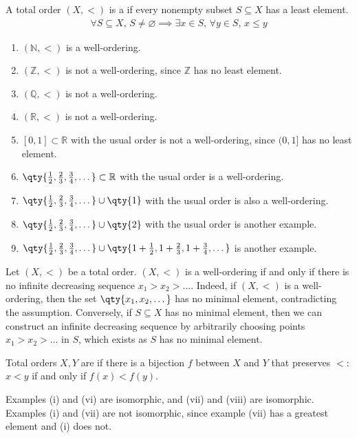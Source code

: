 \begin{definition}
    A total order $(X, <)$ is a  if every nonempty subset $S \subseteq X$ has a least element.
    \begin{align*}
       \forall S \subseteq X,\, S \neq \varnothing \implies \exists x \in S,\, \forall y \in S,\, x \leq y
    \end{align*}
\end{definition}
\begin{example}
    \begin{enumerate}
        \item $(\mathbb N, <)$ is a well-ordering.
        \item $(\mathbb Z, <)$ is not a well-ordering, since $\mathbb Z$ has no least element.
        \item $(\mathbb Q, <)$ is not a well-ordering.
        \item $(\mathbb R, <)$ is not a well-ordering.
        \item $[0,1] \subset \mathbb R$ with the usual order is not a well-ordering, since $(0,1]$ has no least element.
        \item $\qty{\frac{1}{2}, \frac{2}{3}, \frac{3}{4}, \dots} \subset \mathbb R$ with the usual order is a well-ordering.
        \item $\qty{\frac{1}{2}, \frac{2}{3}, \frac{3}{4}, \dots} \cup \qty{1}$ with the usual order is also a well-ordering.
        \item $\qty{\frac{1}{2}, \frac{2}{3}, \frac{3}{4}, \dots} \cup \qty{2}$ with the usual order is another example.
        \item $\qty{\frac{1}{2}, \frac{2}{3}, \frac{3}{4}, \dots} \cup \qty{1 + \frac{1}{2}, 1 + \frac{2}{3}, 1 + \frac{3}{4}, \dots}$ is another example.
    \end{enumerate}
\end{example}
\begin{remark}
    Let $(X, <)$ be a total order.
    $(X, <)$ is a well-ordering if and only if there is no infinite decreasing sequence $x_1 > x_2 > \dots$.
    Indeed, if $(X, <)$ is a well-ordering, then the set $\qty{x_1, x_2, \dots}$ has no minimal element, contradicting the assumption.
    Conversely, if $S \subseteq X$ has no minimal element, then we can construct an infinite decreasing sequence by arbitrarily choosing points $x_1 > x_2 > \dots$ in $S$, which exists as $S$ has no minimal element.
\end{remark}
\begin{definition}
    Total orders $X, Y$ are  if there is a bijection $f$ between $X$ and $Y$ that preserves $<$: $x < y$ if and only if $f(x) < f(y)$.
\end{definition}
Examples (i) and (vi) are isomorphic, and (vii) and (viii) are isomorphic.
Examples (i) and (vii) are not isomorphic, since example (vii) has a greatest element and (i) does not.

